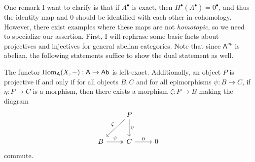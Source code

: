One remark I want to clarify is that if $A^{\bullet} $ is exact, then $H^{\bullet} (A^{\bullet} )=0^{\bullet} $, and thus the identity map and $0$ should be identified with each other in cohomology. However, there exist examples where these maps are not \emph{homotopic}, so we need to specialize our assertion. First, I will rephrase some basic facts about projectives and injectives for general abelian categories. Note that since $\mathsf{A} ^{op} $ is abelian, the following statements suffice to show the dual statement as well.
\begin{lemma}\label{lma:9.5.3}
	The functor $\operatorname{Hom}_{\mathsf{A} }(X, -) : \mathsf{A}  \to \mathsf{Ab} $ is left-exact. Additionally, an object $P$ is projective if and only if for all objects $B,C$ and for all epimorphisms $\psi : B \to C$, if $\eta : P \to C$ is a morphism, then there exists a morphism $\zeta : P \to B$ making the diagram
	\[\begin{tikzcd}[row sep = 2.5em, column sep = 2.5em]
		&P\ar[dl, "\zeta "']\ar[d, "\eta "]\\
		B\ar[r, "\psi ", two heads]&C\ar[r, "0"]&0
	\end{tikzcd}\]
	commute.
\end{lemma}
